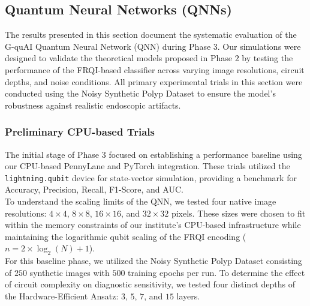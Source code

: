 \documentclass{oqireport}
\begin{document}
\subsection{Quantum Neural Networks (QNNs)}
The results presented in this section document the systematic evaluation of the G-quAI Quantum Neural Network (QNN) during Phase 3. Our simulations were designed to validate the theoretical models proposed in Phase $2$ by testing the performance of the FRQI-based classifier across varying image resolutions, circuit depths, and noise conditions. All primary experimental trials in this section were conducted using the Noisy Synthetic Polyp Dataset to ensure the model's robustness against realistic endoscopic artifacts.


\subsubsection{Preliminary CPU-based Trials}
The initial stage of Phase $3$ focused on establishing a performance baseline using our CPU-based PennyLane and PyTorch integration. These trials utilized the \texttt{lightning.qubit} device for state-vector simulation, providing a benchmark for Accuracy, Precision, Recall, F1-Score, and AUC. \\
To understand the scaling limits of the QNN, we tested four native image resolutions: $4 \times 4$, $8 \times 8$, $16 \times 16$, and $32 \times 32$ pixels. These sizes were chosen to fit within the memory constraints of our institute's CPU-based infrastructure while maintaining the logarithmic qubit scaling of the FRQI encoding ($n = 2 \times \log_2(N) + 1$). \\
For this baseline phase, we utilized the Noisy Synthetic Polyp Dataset consisting of $250$ synthetic images with $500$ training epochs per run. To determine the effect of circuit complexity on diagnostic sensitivity, we tested four distinct depths of the Hardware-Efficient Ansatz: $3$, $5$, $7$, and $15$ layers.
\end{document}
